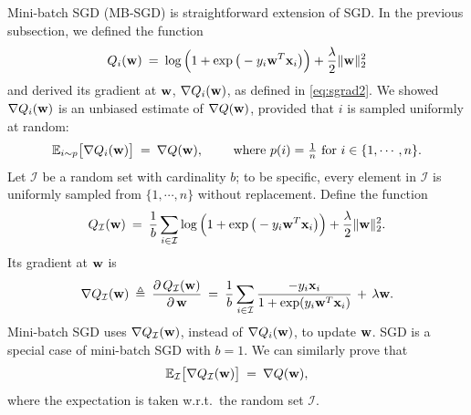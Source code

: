 \documentclass[11pt]{article}
\numberwithin{equation}{section}
\def\w{{\bf w}}
\def\x{{\bf x}}
\def\IM{{\mathcal I}}
\def\EB{{\mathbb E}}
\begin{document}
Mini-batch SGD (MB-SGD) is straightforward extension of SGD.
In the previous subsection, we defined the function
\begin{equation*}
Q_i (\w) \: = \: \log \Big( 1 + \exp \big( - y_i \w^T \x_i \big) \Big) + \frac{\lambda}{2} \|\w \|_2^2 
\end{equation*}
and derived its gradient at $\w$, $\nabla Q_i (\w)$, as defined in \eqref{eq:sgrad2}.
We showed $\nabla Q_i (\w)$ is an unbiased estimate of $\nabla Q (\w)$, provided that $i$ is sampled uniformly at random:
\begin{equation*}
\EB_{i\sim p} \big[ \nabla Q_i (\w) \big]
\: = \: \nabla Q (\w) ,
\qquad \textrm{ where } p(i) = \tfrac{1}{n} \textrm{ for } i \in \{1, \cdots , n \} .
\end{equation*}
Let $\IM$ be a random set with cardinality $b$;
to be specific, every element in $\IM$ is uniformly sampled from $\{1, \cdots , n \}$ without replacement.
Define the function
\begin{equation*}
Q_{\IM} (\w) \: = \: \frac{1}{b} \sum_{i \in \IM} \log \Big( 1 + \exp \big( - y_i \w^T \x_i \big) \Big) + \frac{\lambda}{2} \|\w \|_2^2 .
\end{equation*}
Its gradient at $\w$ is
\begin{equation} \label{eq:mb_grad}
\nabla Q_{\IM} (\w) \: \triangleq \:
\frac{ \partial \, Q_{\IM} (\w ) }{\partial \, \w }
\: = \:
\frac{1}{b} \sum_{i \in \IM}  \frac{ - y_i \x_i }{1+\exp({y_i \w^T \x_i})} \, + \, \lambda \w .
\end{equation}
Mini-batch SGD uses $\nabla Q_{\IM} (\w)$, instead of $\nabla Q_i (\w)$, to update $\w$.
SGD is a special case of mini-batch SGD with $b=1$.
We can similarly prove that
\begin{equation*}
\EB_{\IM } \big[ \nabla Q_{\IM} (\w) \big]
\: = \: \nabla Q (\w) ,
\end{equation*}
where the expectation is taken w.r.t.\ the random set $\IM$.
\end{document}

